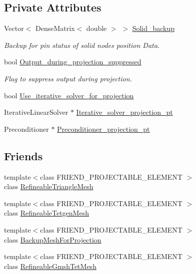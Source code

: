 \subsection*{Private Attributes}
\begin{DoxyCompactItemize}
\item 
Vector$<$ Dense\+Matrix$<$ double $>$ $>$ \hyperlink{classoomph_1_1ProjectionProblem_af085e8e2152466d7a98eebff07ea9271}{Solid\+\_\+backup}
\begin{DoxyCompactList}\small\item\em Backup for pin status of solid node\textquotesingle{}s position Data. \end{DoxyCompactList}\item 
bool \hyperlink{classoomph_1_1ProjectionProblem_a628ff404b240c75244eea7d38e5363dd}{Output\+\_\+during\+\_\+projection\+\_\+suppressed}
\begin{DoxyCompactList}\small\item\em Flag to suppress output during projection. \end{DoxyCompactList}\item 
bool \hyperlink{classoomph_1_1ProjectionProblem_a917be524f0312bcf05c399d7c05f95a5}{Use\+\_\+iterative\+\_\+solver\+\_\+for\+\_\+projection}
\item 
Iterative\+Linear\+Solver $\ast$ \hyperlink{classoomph_1_1ProjectionProblem_a74cb4279bf7d10be200610ca73be4d90}{Iterative\+\_\+solver\+\_\+projection\+\_\+pt}
\item 
Preconditioner $\ast$ \hyperlink{classoomph_1_1ProjectionProblem_ac351713a8fba2e5595955afaf65ab22a}{Preconditioner\+\_\+projection\+\_\+pt}
\end{DoxyCompactItemize}
\subsection*{Friends}
\begin{DoxyCompactItemize}
\item 
{\footnotesize template$<$class F\+R\+I\+E\+N\+D\+\_\+\+P\+R\+O\+J\+E\+C\+T\+A\+B\+L\+E\+\_\+\+E\+L\+E\+M\+E\+NT $>$ }\\class \hyperlink{classoomph_1_1ProjectionProblem_a13d7a9943fbdd399011c849d5839c211}{Refineable\+Triangle\+Mesh}
\item 
{\footnotesize template$<$class F\+R\+I\+E\+N\+D\+\_\+\+P\+R\+O\+J\+E\+C\+T\+A\+B\+L\+E\+\_\+\+E\+L\+E\+M\+E\+NT $>$ }\\class \hyperlink{classoomph_1_1ProjectionProblem_a999f3861375bbdf2365f6ab38447a2c4}{Refineable\+Tetgen\+Mesh}
\item 
{\footnotesize template$<$class F\+R\+I\+E\+N\+D\+\_\+\+P\+R\+O\+J\+E\+C\+T\+A\+B\+L\+E\+\_\+\+E\+L\+E\+M\+E\+NT $>$ }\\class \hyperlink{classoomph_1_1ProjectionProblem_a01ad4b9aac17e6b8e251ce52ba21bfe4}{Backup\+Mesh\+For\+Projection}
\item 
{\footnotesize template$<$class F\+R\+I\+E\+N\+D\+\_\+\+P\+R\+O\+J\+E\+C\+T\+A\+B\+L\+E\+\_\+\+E\+L\+E\+M\+E\+NT $>$ }\\class \hyperlink{classoomph_1_1ProjectionProblem_a933521be2c09eb1842625109de7a8b66}{Refineable\+Gmsh\+Tet\+Mesh}
\end{DoxyCompactItemize}


